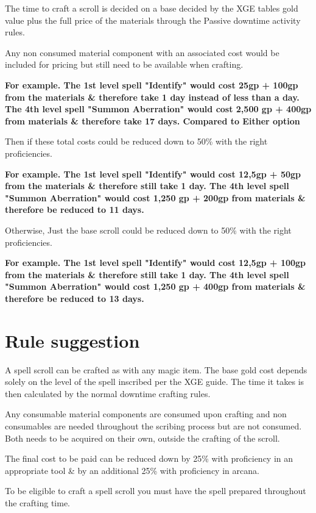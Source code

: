 \documentclass{article}
\begin{document}
    The time to craft a scroll is decided on a base decided by the XGE tables gold value plus the full price of the materials through the Passive downtime activity rules. 

    Any non consumed material component with an associated cost would be included for pricing but still need to be available when crafting.

    \textbf{For example. The 1st level spell "Identify" would cost 25gp + 100gp from the materials \& therefore take 1 day instead of less than a day. The 4th level spell "Summon Aberration" would cost 2,500 gp + 400gp from materials \& therefore take 17 days. Compared to Either option}

    Then if these total costs could be reduced down to 50\% with the right proficiencies.

    \textbf{For example. The 1st level spell "Identify" would cost 12,5gp + 50gp from the materials \& therefore still take 1 day. The 4th level spell "Summon Aberration" would cost 1,250 gp + 200gp from materials \& therefore be reduced to 11 days.}
    
    Otherwise, Just the base scroll could be reduced down to 50\% with the right proficiencies.
    
    \textbf{For example. The 1st level spell "Identify" would cost 12,5gp + 100gp from the materials \& therefore still take 1 day. The 4th level spell "Summon Aberration" would cost 1,250 gp + 400gp from materials \& therefore be reduced to 13 days.}
    
    \newpage
    \section*{Rule suggestion}

    A spell scroll can be crafted as with any magic item. The base gold cost depends solely on the level of the spell inscribed per the XGE guide. The time it takes is then calculated by the normal downtime crafting rules. 
    
    Any consumable material components are consumed upon crafting and non consumables are needed throughout the scribing process but are not consumed. 
    Both needs to be acquired on their own, outside the crafting of the scroll.

    The final cost to be paid can be reduced down by 25\% with proficiency in an appropriate tool \& by an additional 25\% with proficiency in arcana.

    To be eligible to craft a spell scroll you must have the spell prepared throughout the crafting time. 
\end{document}
